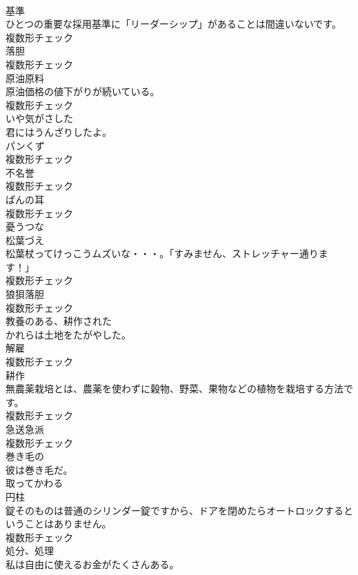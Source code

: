 \documentclass[8pt]{extreport}
\begin{document}
\begin{CJK}{UTF8}{min}
\\	[名詞]	基準	
\\	ひとつの重要な採用基準に「リーダーシップ」があることは間違いないです。	
\\	複数形チェック
\\	[名詞]	落胆	
\\	複数形チェック
\\	[名詞]	原油原料	
\\	原油価格の値下がりが続いている。	
\\	複数形チェック
\\	[形容詞]	いや気がさした	
\\	君にはうんざりしたよ。	
\\	[名詞]	パンくず	
\\	複数形チェック
\\	[名詞]	不名誉	
\\	複数形チェック
\\	[名詞]	ぱんの耳	
\\	複数形チェック
\\	[形容詞]	憂うつな	
\\	[名詞]	松葉づえ	
\\	松葉杖ってけっこうムズいな・・・。「すみません、ストレッチャー通ります！」	
\\	複数形チェック
\\	[名詞]	狼狽落胆	
\\	複数形チェック
\\	[形容詞]	教養のある、耕作された	
\\	かれらは土地をたがやした。	
\\	[名詞]	解雇	
\\	複数形チェック
\\	[名詞]	耕作	
\\	無農薬栽培とは、農薬を使わずに穀物、野菜、果物などの植物を栽培する方法です。	
\\	複数形チェック
\\	[名詞]	急送急派	
\\	複数形チェック
\\	[形容詞]	巻き毛の	
\\	彼は巻き毛だ。	
\\	[動詞]	取ってかわる	
\\	[名詞]	円柱	
\\	錠そのものは普通のシリンダー錠ですから、ドアを閉めたらオートロックするということはありません。	
\\	複数形チェック
\\	[名詞]	処分、処理	
\\	私は自由に使えるお金がたくさんある。	

\end{CJK}
\end{document}
